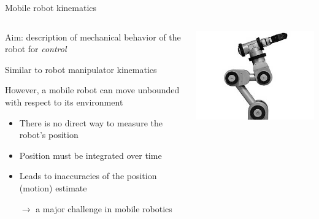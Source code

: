 \documentclass[compress]{beamer}
\begin{document}
\begin{frame}{Mobile robot kinematics}

    \begin{columns}
        \begin{column}{0.6\linewidth}
            Aim: description of mechanical behavior of the robot for \emph{control}

            Similar to robot manipulator kinematics

            However, a mobile robot can move unbounded with respect to its
            environment

            \begin{itemize}
                \item There is no direct way to measure the robot's position
                \item Position must be integrated over time
                \item Leads to inaccuracies of the position (motion) estimate

                    $\rightarrow$ a major challenge in mobile robotics
            \end{itemize}

        \end{column}
        \begin{column}{0.4\linewidth}
            \begin{center}
                \includegraphics[width=\linewidth]{kinematics_ex1}
            \end{center}
        \end{column}
    \end{columns}

\end{frame}
\end{document}
